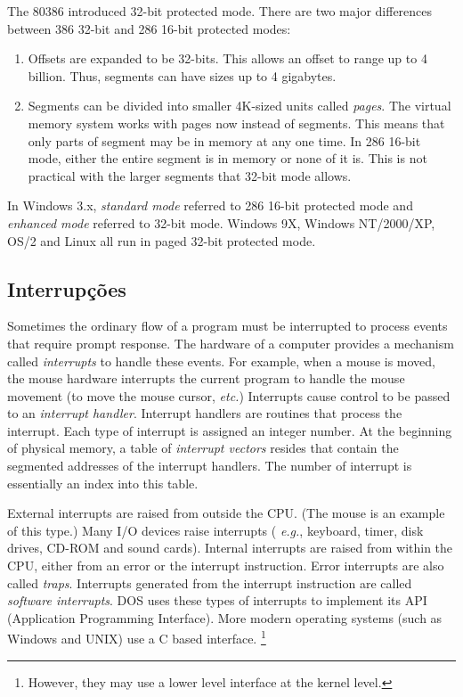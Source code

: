 The 80386 introduced 32-bit protected mode. There are two major differences
between 386 32-bit and 286 16-bit protected modes:
\begin{enumerate}
\item

Offsets are expanded to be 32-bits. This allows an offset to range up
to 4 billion. Thus, segments can have sizes up to 4 gigabytes.

\item

Segments can be divided into smaller 4K-sized
units called \emph{pages}. The virtual
memory system works with pages now instead of
segments. This means that only parts of segment may be in memory at
any one time. In 286 16-bit mode, either the entire segment is in
memory or none of it is. This is not practical with the larger
segments that 32-bit mode allows.

\end{enumerate}


In Windows 3.x, \emph{standard mode} referred to 286 16-bit protected mode and
\emph{enhanced mode} referred to 32-bit mode. Windows 9X, Windows NT/2000/XP, OS/2
and Linux all run in paged 32-bit protected mode.

\subsection{Interrupções}

Sometimes the ordinary flow of a program must be interrupted to process events
that require prompt response. The hardware of a computer provides a mechanism
called \emph{interrupts} to handle these events. For example, when a mouse is
moved, the mouse hardware interrupts the current program to handle the mouse
movement (to move the mouse cursor, {\em etc.\/}) Interrupts cause control to
be passed to an \emph{interrupt handler}. Interrupt handlers are routines that
process the interrupt. Each type of interrupt is assigned an integer number.
At the beginning of physical memory, a table of \emph{interrupt vectors}
resides that contain the segmented addresses of the interrupt handlers. The
number of interrupt is essentially an index into this table.

External interrupts are raised from outside the CPU. (The mouse is an
example of this type.) Many I/O devices raise interrupts ({\em
e.g.\/}, keyboard, timer, disk drives, CD-ROM and sound
cards). Internal interrupts are raised from within the CPU, either
from an error or the interrupt instruction. Error interrupts are also
called \emph{traps}. Interrupts generated from the interrupt
instruction are called \emph{software interrupts}. DOS uses these types of
interrupts to implement its API (Application Programming Interface). More
modern operating systems (such as Windows and UNIX) use a C based interface.
\footnote{However, they may use a lower level interface at the kernel level.}

